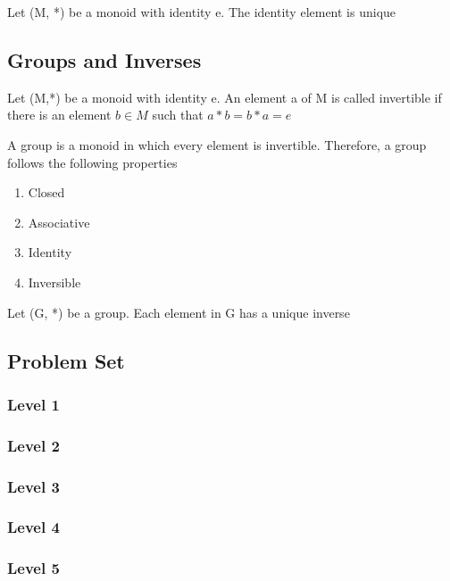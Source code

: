 \documentclass{article}
\begin{document}
\begin{theorem}
    Let (M, *) be a monoid with identity e. The identity element is unique
\end{theorem}

\subsection{Groups and Inverses}

\begin{definition}[Inverse]
    Let (M,*) be a monoid with identity e. An element a of M is called invertible
    if there is an element \( b \in M \) such that \( a * b = b * a = e \)
\end{definition}

\begin{definition}[Group]
    A group is a monoid in which every element is invertible. Therefore, a group
    follows the following properties
    \begin{enumerate}
	\item Closed
	\item Associative
	\item Identity
	\item Inversible
    \end{enumerate}
\end{definition}

\begin{theorem}
    Let (G, *) be a group. Each element in G has a unique inverse
\end{theorem}

\subsection{Problem Set}
\subsubsection{Level 1}
\subsubsection{Level 2}
\subsubsection{Level 3}
\subsubsection{Level 4}
\subsubsection{Level 5}
\pagebreak
\end{document}
